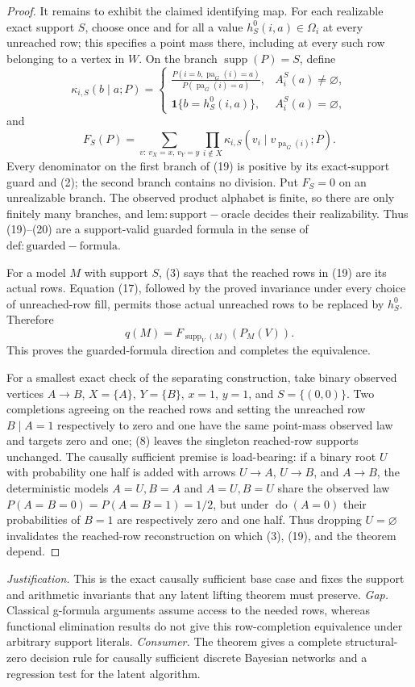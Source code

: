 \documentclass{article}
\begin{document}
\begin{proof}
It remains to exhibit the claimed identifying map.  For each realizable exact support \(S\), choose once and for all a value \(h_S^0(i,a)\in\Omega_i\) at every unreached row; this specifies a point mass there, including at every such row belonging to a vertex in \(W\).  On the branch \(\operatorname{supp}(P)=S\), define
\[
 \kappa_{i,S}(b\mid a;P)=
 \begin{cases}
 \displaystyle
 \frac{P(i=b,\operatorname{pa}_G(i)=a)}
 {P(\operatorname{pa}_G(i)=a)},
 &A_i^S(a)\neq\varnothing,\\[1.2ex]
 \mathbf 1\{b=h_S^0(i,a)\},
 &A_i^S(a)=\varnothing,
 \end{cases}
 \tag{19}
\]
and
\[
 F_S(P)=
 \sum_{v:\,v_X=x,\,v_Y=y}
 \prod_{i\notin X}
 \kappa_{i,S}(v_i\mid v_{\operatorname{pa}_G(i)};P).
 \tag{20}
\]
Every denominator on the first branch of (19) is positive by its exact-support guard and (2); the second branch contains no division.  Put \(F_S=0\) on an unrealizable branch.  The observed product alphabet is finite, so there are only finitely many branches, and \(\mathrm{lem:support-oracle}\) decides their realizability.  Thus (19)--(20) are a support-valid guarded formula in the sense of \(\mathrm{def:guarded-formula}\).

For a model \(M\) with support \(S\), (3) says that the reached rows in (19) are its actual rows.  Equation (17), followed by the proved invariance under every choice of unreached-row fill, permits those actual unreached rows to be replaced by \(h_S^0\).  Therefore
\[
 q(M)=F_{\operatorname{supp}_V(M)}(P_M(V)).
 \tag{21}
\]
This proves the guarded-formula direction and completes the equivalence.

For a smallest exact check of the separating construction, take binary observed vertices \(A\to B\), \(X=\{A\}\), \(Y=\{B\}\), \(x=1\), \(y=1\), and \(S=\{(0,0)\}\).  Two completions agreeing on the reached rows and setting the unreached row \(B\mid A=1\) respectively to zero and one have the same point-mass observed law and targets zero and one; (8) leaves the singleton reached-row supports unchanged.  The causally sufficient premise is load-bearing: if a binary root \(U\) with probability one half is added with arrows \(U\to A\), \(U\to B\), and \(A\to B\), the deterministic models \(A=U,B=A\) and \(A=U,B=U\) share the observed law \(P(A=B=0)=P(A=B=1)=1/2\), but under \(\operatorname{do}(A=0)\) their probabilities of \(B=1\) are respectively zero and one half.  Thus dropping \(U=\varnothing\) invalidates the reached-row reconstruction on which (3), (19), and the theorem depend.
\end{proof}
\par\smallskip\noindent \textit{Justification.} This is the exact causally sufficient base case and fixes the support and arithmetic invariants that any latent lifting theorem must preserve. \textit{Gap.} Classical g-formula arguments assume access to the needed rows, whereas functional elimination results do not give this row-completion equivalence under arbitrary support literals. \textit{Consumer.} The theorem gives a complete structural-zero decision rule for causally sufficient discrete Bayesian networks and a regression test for the latent algorithm.
\end{document}
